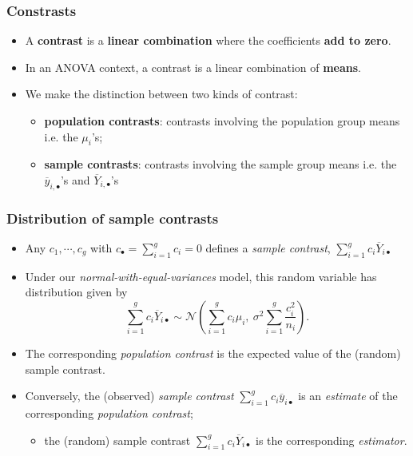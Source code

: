 \documentclass[a4paper]{article}\usepackage[]{graphicx}\usepackage[]{xcolor}
\begin{document}
\subsubsection{Constrasts}
\begin{itemize}
	\item A \textbf{contrast} is a \textbf{linear combination} where the coefficients \textbf{add to zero}.
	\item In an ANOVA context, a contrast is a linear combination of \textbf{means}.
	\item We make the distinction between two kinds of contrast:
	\begin{itemize}
		\item \textcolor{mygreen}{\textbf{population contrasts}}: contrasts involving the population group means i.e. the \( \mu_i \)'s;
		\item \textcolor{myred}{\textbf{sample contrasts}}: contrasts involving the sample group means i.e. the \( \overline{y}_{i,\bullet} \)'s and \( \overline{Y}_{i,\bullet} \)'s 
	\end{itemize}
\end{itemize}
\subsubsection{Distribution of sample contrasts}
\begin{itemize}
	\item Any \( c_1,\dotsb,c_g \) with \( c_\bullet = \sum_{i=1}^{g} c_i = 0 \) defines a \textit{sample contrast}, \( \sum_{i=1}^{g} c_i \overline{Y}_{i\bullet} \)  
	\item Under our \textit{normal-with-equal-variances} model, this random variable has distribution given by
	\[
		\sum_{i=1}^gc_i\overline Y_{i\bullet}\sim \mathcal{N}\left( \sum_{i=1}^gc_i\mu_i,\ \sigma^2 \sum_{i=1}^g \frac{c_i^2}{n_i} \right).
	\]
	\item The corresponding \textit{population contrast} is the expected value of the (random) sample contrast.
	\item Conversely, the (observed) \textit{sample contrast} \( \sum\limits_{i=1}^gc_i \overline y_{i\bullet} \) is an \textit{estimate} of the corresponding \textit{population contrast};
	\begin{itemize}
		\item the (random) sample contrast \( \sum\limits_{i=1}^gc_i \overline Y_{i\bullet} \) is the corresponding \textit{estimator}.
	\end{itemize}
\end{itemize}
\end{document}
